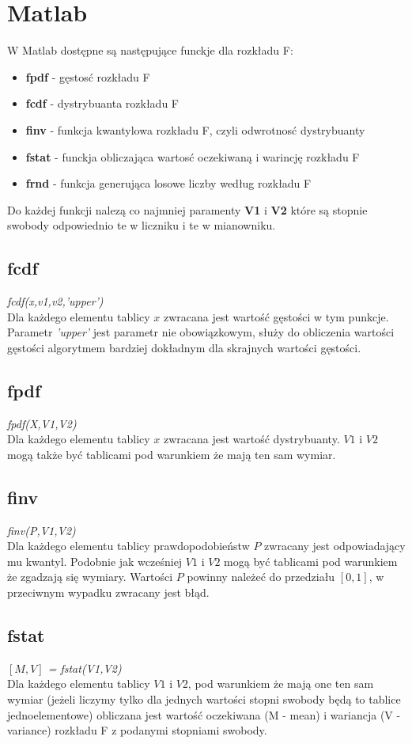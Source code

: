 \documentclass{article}
\begin{document}
\newpage
\section{Matlab}
W Matlab dostępne są następujące funckje dla rozkładu F:
\begin{itemize}
\item \textbf{fpdf} - gęstosć rozkładu F
\item \textbf{fcdf} - dystrybuanta rozkładu F
\item \textbf{finv} - funkcja kwantylowa rozkładu F, czyli odwrotnosć dystrybuanty
\item \textbf{fstat} - funckja obliczająca wartosć oczekiwaną i warincję rozkładu F
\item \textbf{frnd} - funkcja generująca losowe liczby według rozkładu F
\end{itemize}
Do każdej funkcji nalezą co najmniej paramenty \textbf{V1} i \textbf{V2} które są stopnie swobody odpowiednio te w liczniku i te w mianowniku.
\subsection{fcdf}
\textit{fcdf(x,v1,v2,'upper')} \\
Dla każdego elementu tablicy $x$ zwracana jest wartość gęstości w tym punkcje. Parametr \textit{'upper'} jest parametr nie obowiązkowym, służy do obliczenia wartości gęstości algorytmem bardziej dokładnym dla skrajnych wartości gęstości.

\subsection{fpdf}
\textit{fpdf(X,V1,V2)}\\
Dla każdego elementu tablicy $x$ zwracana jest wartość dystrybuanty. $V1$ i $V2$ mogą także być tablicami pod warunkiem że mają ten sam wymiar.

\subsection{finv}
\textit{finv(P,V1,V2)} \\
Dla każdego elementu tablicy prawdopodobieństw $P$ zwracany jest odpowiadający mu kwantyl. Podobnie jak wcześniej $V1$ i $V2$ mogą być tablicami pod warunkiem że zgadzają się wymiary. Wartości $P$ powinny należeć do przedziału $[0,1]$, w przeciwnym wypadku zwracany jest błąd.

\subsection{fstat}
\textit{ $[M,V]$ = fstat(V1,V2)} \\
Dla każdego elementu tablicy $V1$ i $V2$, pod warunkiem że mają one ten sam wymiar (jeżeli liczymy tylko dla jednych wartości stopni swobody będą to tablice jednoelementowe) obliczana jest wartość oczekiwana (M - mean) i wariancja (V - variance) rozkładu F z podanymi stopniami swobody.
\end{document}
